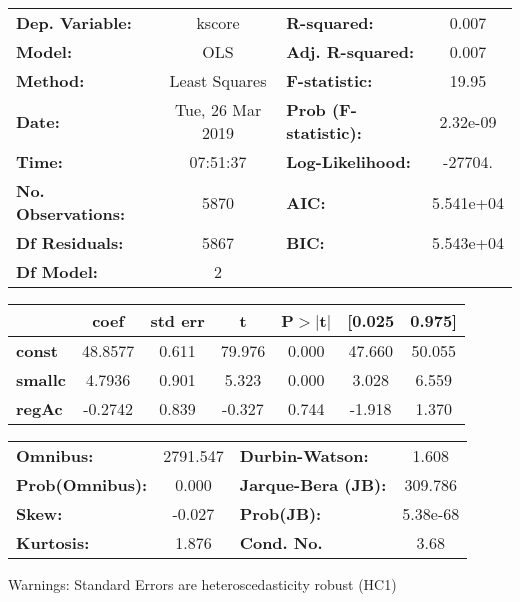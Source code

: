 \begin{center}
\begin{tabular}{lclc}
\toprule
\textbf{Dep. Variable:}    &      kscore      & \textbf{  R-squared:         } &     0.007   \\
\textbf{Model:}            &       OLS        & \textbf{  Adj. R-squared:    } &     0.007   \\
\textbf{Method:}           &  Least Squares   & \textbf{  F-statistic:       } &     19.95   \\
\textbf{Date:}             & Tue, 26 Mar 2019 & \textbf{  Prob (F-statistic):} &  2.32e-09   \\
\textbf{Time:}             &     07:51:37     & \textbf{  Log-Likelihood:    } &   -27704.   \\
\textbf{No. Observations:} &        5870      & \textbf{  AIC:               } & 5.541e+04   \\
\textbf{Df Residuals:}     &        5867      & \textbf{  BIC:               } & 5.543e+04   \\
\textbf{Df Model:}         &           2      & \textbf{                     } &             \\
\bottomrule
\end{tabular}
\begin{tabular}{lcccccc}
                & \textbf{coef} & \textbf{std err} & \textbf{t} & \textbf{P$>$$|$t$|$} & \textbf{[0.025} & \textbf{0.975]}  \\
\midrule
\textbf{const}  &      48.8577  &        0.611     &    79.976  &         0.000        &       47.660    &       50.055     \\
\textbf{smallc} &       4.7936  &        0.901     &     5.323  &         0.000        &        3.028    &        6.559     \\
\textbf{regAc}  &      -0.2742  &        0.839     &    -0.327  &         0.744        &       -1.918    &        1.370     \\
\bottomrule
\end{tabular}
\begin{tabular}{lclc}
\textbf{Omnibus:}       & 2791.547 & \textbf{  Durbin-Watson:     } &    1.608  \\
\textbf{Prob(Omnibus):} &   0.000  & \textbf{  Jarque-Bera (JB):  } &  309.786  \\
\textbf{Skew:}          &  -0.027  & \textbf{  Prob(JB):          } & 5.38e-68  \\
\textbf{Kurtosis:}      &   1.876  & \textbf{  Cond. No.          } &     3.68  \\
\bottomrule
\end{tabular}
\end{center}

Warnings: \newline
 [1] Standard Errors are heteroscedasticity robust (HC1)
